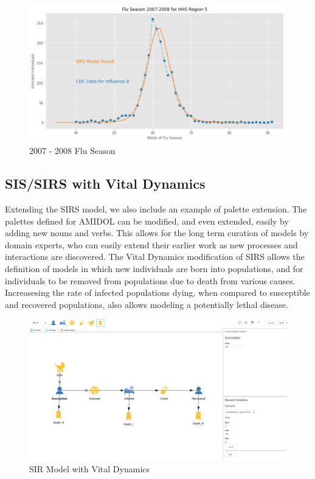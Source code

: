 \documentclass[11pt]{article}
\newcommand{\amidol}{\textsc{AMIDOL}}
\begin{document}
\begin{figure}
\includegraphics[width=\textwidth]{figs/2007-2008-SIRS.pdf}
\caption{2007 - 2008 Flu Season}
\label{Fig:R0}
\end{figure}

\subsection{SIS/SIRS with Vital Dynamics}

Extending the SIRS model, we also include an example of palette extension.  The palettes defined for \amidol{} can be modified, and even extended, easily by adding new nouns and verbs.  This allows for the long term curation of models by domain experts, who can easily extend their earlier work as new processes and interactions are discovered.  The Vital Dynamics modification of SIRS allows the definition of models in which new individuals are born into populations, and for individuals to be removed from populations due to death from various causes.  Increasesing the rate of infected populations dying, when compared to susceptible and recovered populations, also allows modeling a potentially lethal disease.

\begin{figure}
\includegraphics[width=\textwidth]{figs/SIR-VD.png}
\caption{SIR Model with Vital Dynamics}
\label{Fig:SIR-VD-Draw}
\end{figure}
\end{document}
